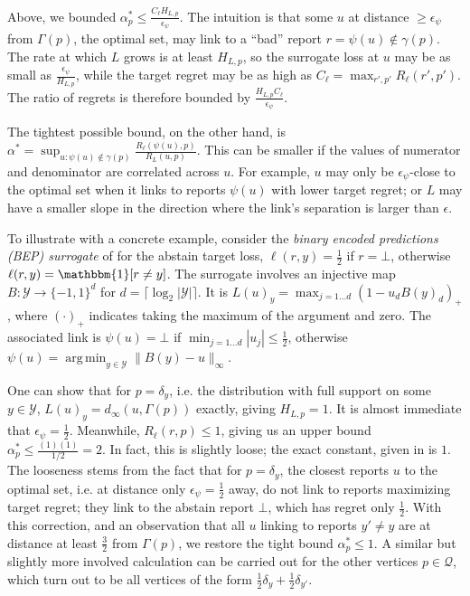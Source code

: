 \documentclass{article}
\theoremstyle{definition}\newtheorem{definition}{Definition}
\theoremstyle{definition}\newtheorem{assumption}{Assumption}
\DeclareMathOperator*{\argmin}{arg\,min}
\newcommand{\Y}{\mathcal{Y}}
\newcommand{\ones}{\mathbbm{1}}
\begin{document}
Above, we bounded $\alpha_p^* \leq \frac{C_{\ell} H_{L,p}}{\epsilon_{\psi}}$.
The intuition is that some $u$ at distance $\geq \epsilon_{\psi}$ from $\Gamma(p)$, the optimal set, may link to a ``bad'' report $r = \psi(u) \not\in \gamma(p)$.
The rate at which $L$ grows is at least $H_{L,p}$, so the surrogate loss at $u$ may be as small as $\frac{\epsilon_{\psi}}{H_{L,p}}$, while the target regret may be as high as $C_{\ell} = \max_{r',p'} R_{\ell}(r',p')$.
The ratio of regrets is therefore bounded by $\frac{H_{L,p} C_{\ell}}{\epsilon_{\psi}}$.

The tightest possible bound, on the other hand, is $\alpha^* = \sup_{u: \psi(u) \not\in \gamma(p)} \frac{R_{\ell}(\psi(u),p)}{R_L(u,p)}$.
This can be smaller if the values of numerator and denominator are correlated across $u$.
For example, $u$ may only be $\epsilon_{\psi}$-close to the optimal set when it links to reports $\psi(u)$ with lower target regret; or $L$ may have a smaller slope in the direction where the link's separation is larger than $\epsilon$.

To illustrate with a concrete example, consider the \emph{binary encoded predictions (BEP) surrogate} of \cite{ramaswamy2018consistent} for the abstain target loss, $\ell(r,y) = \frac{1}{2}$ if $r = \bot$, otherwise $\ell(r,y) = \ones[r \neq y]$.
The surrogate involves an injective map $B: \Y \to \{-1,1\}^d$ for $d = \lceil \log_2 |\Y| \rceil$.
It is $L(u)_y = \max_{j=1\dots d} (1 - u_d B(y)_d)_+$, where $(\cdot)_+$ indicates taking the maximum of the argument and zero.
The associated link is $\psi(u) = \bot$ if $\min_{j=1\dots d} |u_j| \leq \tfrac{1}{2}$, otherwise $\psi(u) = \argmin_{y \in \Y} \|B(y) - u\|_{\infty}$.

One can show that for $p = \delta_y$, i.e. the distribution with full support on some $y \in \Y$, $L(u)_y = d_{\infty}(u,\Gamma(p))$ exactly, giving $H_{L,p} = 1$.
It is almost immediate that $\epsilon_{\psi} = \tfrac{1}{2}$.
Meanwhile, $R_{\ell}(r,p) \leq 1$, giving us an upper bound $\alpha^*_p \leq \frac{(1)(1)}{1/2} = 2$.
In fact, this is slightly loose; the exact constant, given in \cite{ramaswamy2018consistent} is $1$.
The looseness stems from the fact that for $p = \delta_y$, the closest reports $u$ to the optimal set, i.e. at distance only $\epsilon_{\psi} = \tfrac{1}{2}$ away, do not link to reports maximizing target regret; they link to the abstain report $\bot$, which has regret only $\tfrac{1}{2}$.
With this correction, and an observation that all $u$ linking to reports $y' \neq y$ are at distance at least $\tfrac{3}{2}$ from $\Gamma(p)$, we restore the tight bound $\alpha^*_p \leq 1$.
A similar but slightly more involved calculation can be carried out for the other vertices $p \in \mathcal{Q}$, which turn out to be all vertices of the form $\tfrac{1}{2} \delta_y + \tfrac{1}{2} \delta_{y'}$.
\end{document}
